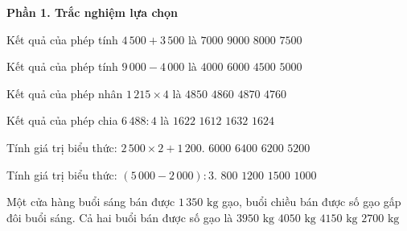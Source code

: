 \textbf{Phần 1. Trắc nghiệm lựa chọn}

\begin{ex} %
Kết quả của phép tính $4\,500 + 3\,500$ là
\choice
{$7000$}
{$9000$}
{\True $8000$}
{$7500$}
\end{ex}

\begin{ex} %
Kết quả của phép tính $9\,000 - 4\,000$ là
\choice
{$4000$}
{$6000$}
{$4500$}
{\True $5000$}
\end{ex}

\begin{ex} %
Kết quả của phép nhân $1\,215 \times 4$ là
\choice
{$4850$}
{\True $4860$}
{$4870$}
{$4760$}
\end{ex}

\begin{ex} %
Kết quả của phép chia $6\,488 : 4$ là
\choice
{\True $1622$}
{$1612$}
{$1632$}
{$1624$}
\end{ex}

\begin{ex} %
Tính giá trị biểu thức: $2\,500 \times 2 + 1\,200$.
\choice
{$6000$}
{$6400$}
{\True $6200$}
{$5200$}
\end{ex}

\begin{ex} %
Tính giá trị biểu thức: $(5\,000 - 2\,000) : 3$.
\choice
{$800$}
{$1200$}
{$1500$}
{\True $1000$}
\end{ex}

\begin{ex} %
Một cửa hàng buổi sáng bán được $1\,350\text{ kg}$ gạo, buổi chiều bán được số gạo gấp đôi buổi sáng. Cả hai buổi bán được số gạo là
\choice
{$3950\text{ kg}$}
{\True $4050\text{ kg}$}
{$4150\text{ kg}$}
{$2700\text{ kg}$}
\end{ex}


